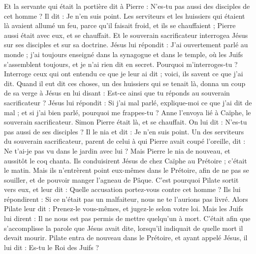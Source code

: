 \begin{multicols}{2}
Et la servante qui était la portière dit à Pierre : N'es-tu pas aussi des disciples de cet homme ? Il dit : Je n'en suis point.
Les serviteurs et les huissiers qui étaient là avaient allumé un feu, parce qu'il faisait froid, et ils se chauffaient ; Pierre aussi était avec eux, et se chauffait.
Et le souverain sacrificateur interrogea Jésus sur ses disciples et sur sa doctrine.
Jésus lui répondit : J'ai ouvertement parlé au monde ; j'ai toujours enseigné dans la synagogue et dans le temple, où les Juifs s'assemblent toujours, et je n'ai rien dit en secret.
Pourquoi m'interroges-tu ? Interroge ceux qui ont entendu ce que je leur ai dit ; voici, ils savent ce que j'ai dit.
Quand il eut dit ces choses, un des huissiers qui se tenait là, donna un coup de sa verge à Jésus en lui disant : Est-ce ainsi que tu réponds au souverain sacrificateur ?
Jésus lui répondit : Si j'ai mal parlé, explique-moi ce que j'ai dit de mal ; et si j'ai bien parlé, pourquoi me frappes-tu ?
Anne l'envoya lié à Caïphe, le souverain sacrificateur.
Simon Pierre était là, et se chauffait. On lui dit : N'es-tu pas aussi de ses disciples ? Il le nia et dit : Je n'en suis point.
Un des serviteurs du souverain sacrificateur, parent de celui à qui Pierre avait coupé l'oreille, dit : Ne t'ai-je pas vu dans le jardin avec lui ?
Mais Pierre le nia de nouveau, et aussitôt le coq chanta.
Ils conduisirent Jésus de chez Caïphe au Prétoire ; c'était le matin. Mais ils n'entrèrent point eux-mêmes dans le Prétoire, afin de ne pas se souiller, et de pouvoir manger l'agneau de Pâque.
C'est pourquoi Pilate sortit vers eux, et leur dit : Quelle accusation portez-vous contre cet homme ?
Ils lui répondirent : Si ce n'était pas un malfaiteur, nous ne te l'aurions pas livré.
Alors Pilate leur dit : Prenez-le vous-mêmes, et jugez-le selon votre loi. Mais les Juifs lui dirent : Il ne nous est pas permis de mettre quelqu'un à mort.
C'était afin que s'accomplisse la parole que Jésus avait dite, lorsqu'il indiquait de quelle mort il devait mourir.
Pilate entra de nouveau dans le Prétoire, et ayant appelé Jésus, il lui dit : Es-tu le Roi des Juifs ?

\end{multicols}
